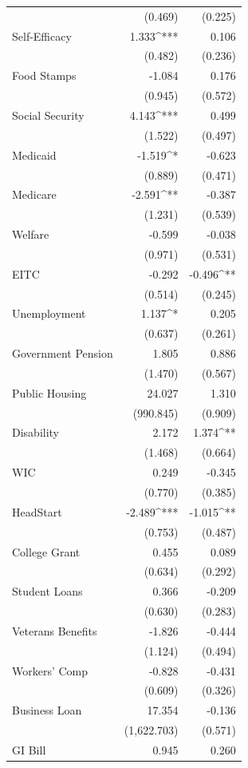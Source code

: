 \documentclass[12pt]{paper}
\begin{document}
\begin{table}[!htbp]
\begin{adjustbox}{width=.6\textwidth}
\begin{tabular}{@{\extracolsep{5pt}}lD{.}{.}{-3} D{.}{.}{-3} }
& (0.469) & (0.225) \\ 
Self-Efficacy & 1.333^{***} & 0.106 \\ 
& (0.482) & (0.236) \\ 
Food Stamps & -1.084 & 0.176 \\ 
& (0.945) & (0.572) \\ 
Social Security & 4.143^{***} & 0.499 \\ 
& (1.522) & (0.497) \\ 
Medicaid & -1.519^{*} & -0.623 \\ 
& (0.889) & (0.471) \\ 
Medicare & -2.591^{**} & -0.387 \\ 
& (1.231) & (0.539) \\ 
Welfare & -0.599 & -0.038 \\ 
& (0.971) & (0.531) \\ 
EITC & -0.292 & -0.496^{**} \\ 
& (0.514) & (0.245) \\ 
Unemployment & 1.137^{*} & 0.205 \\ 
& (0.637) & (0.261) \\ 
Government Pension & 1.805 & 0.886 \\ 
& (1.470) & (0.567) \\ 
Public Housing & 24.027 & 1.310 \\ 
& (990.845) & (0.909) \\ 
Disability & 2.172 & 1.374^{**} \\ 
& (1.468) & (0.664) \\ 
WIC & 0.249 & -0.345 \\ 
& (0.770) & (0.385) \\ 
HeadStart & -2.489^{***} & -1.015^{**} \\ 
& (0.753) & (0.487) \\ 
College Grant & 0.455 & 0.089 \\ 
& (0.634) & (0.292) \\ 
Student Loans & 0.366 & -0.209 \\ 
& (0.630) & (0.283) \\ 
Veterans Benefits & -1.826 & -0.444 \\ 
& (1.124) & (0.494) \\ 
Workers' Comp & -0.828 & -0.431 \\ 
& (0.609) & (0.326) \\ 
Business Loan & 17.354 & -0.136 \\ 
& (1,622.703) & (0.571) \\ 
GI Bill & 0.945 & 0.260 \\ 

\end{tabular}
\end{adjustbox}
\end{table}
\end{document}
